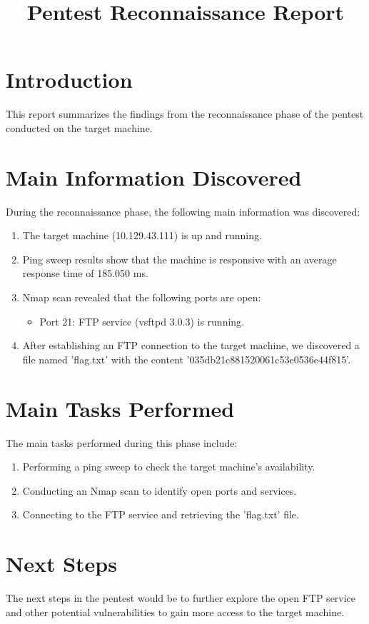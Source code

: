 \documentclass{article}
\title{Pentest Reconnaissance Report}
\author{}
\date{}
\begin{document}
\maketitle

\section{Introduction}
This report summarizes the findings from the reconnaissance phase of the pentest conducted on the target machine.

\section{Main Information Discovered}
During the reconnaissance phase, the following main information was discovered:

\begin{enumerate}
    \item The target machine (10.129.43.111) is up and running.
    \item Ping sweep results show that the machine is responsive with an average response time of 185.050 ms.
    \item Nmap scan revealed that the following ports are open:
    \begin{itemize}
        \item Port 21: FTP service (vsftpd 3.0.3) is running.
    \end{itemize}
    \item After establishing an FTP connection to the target machine, we discovered a file named 'flag.txt' with the content '035db21c881520061c53e0536e44f815'.
\end{enumerate}

\section{Main Tasks Performed}
The main tasks performed during this phase include:

\begin{enumerate}
    \item Performing a ping sweep to check the target machine's availability.
    \item Conducting an Nmap scan to identify open ports and services.
    \item Connecting to the FTP service and retrieving the 'flag.txt' file.
\end{enumerate}

\section{Next Steps}
The next steps in the pentest would be to further explore the open FTP service and other potential vulnerabilities to gain more access to the target machine.
\end{document}
